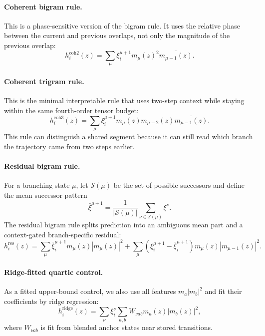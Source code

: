 \documentclass[11pt]{article}
\begin{document}
\paragraph{Coherent bigram rule.}
This is a phase-sensitive version of the bigram rule.  It uses the relative
phase between the current and previous overlaps, not only the magnitude of the
previous overlap:
\begin{equation}
h_i^{\mathrm{coh2}}(z)
=
\sum_\mu
\xi_i^{\mu+1}
m_\mu(z)^2
\overline{m_{\mu-1}(z)} .
\end{equation}

\paragraph{Coherent trigram rule.}
This is the minimal interpretable rule that uses two-step context while staying
within the same fourth-order tensor budget:
\begin{equation}
h_i^{\mathrm{coh3}}(z)
=
\sum_\mu
\xi_i^{\mu+1}
m_\mu(z)
m_{\mu-2}(z)
\overline{m_{\mu-1}(z)} .
\end{equation}
This rule can distinguish a shared segment because it can still read which
branch the trajectory came from two steps earlier.

\paragraph{Residual bigram rule.}
For a branching state $\mu$, let $\mathcal{S}(\mu)$ be the set of possible
successors and define the mean successor pattern
\begin{equation}
\bar{\xi}^{\mu+1}
=
\frac{1}{|\mathcal{S}(\mu)|}
\sum_{\nu\in\mathcal{S}(\mu)}
\xi^\nu .
\end{equation}
The residual bigram rule splits prediction into an ambiguous mean part and a
context-gated branch-specific residual:
\begin{equation}
h_i^{\mathrm{res}}(z)
=
\sum_\mu
\bar{\xi}_i^{\mu+1}
m_\mu(z)|m_\mu(z)|^2
+
\sum_\mu
\left(
\xi_i^{\mu+1}
-
\bar{\xi}_i^{\mu+1}
\right)
m_\mu(z)|m_{\mu-1}(z)|^2 .
\end{equation}

\paragraph{Ridge-fitted quartic control.}
As a fitted upper-bound control, we also use all features
$m_a|m_b|^2$ and fit their coefficients by ridge regression:
\begin{equation}
h_i^{\mathrm{ridge}}(z)
=
\sum_\nu
\xi_i^\nu
\sum_{a,b}
W_{\nu ab}
m_a(z)
|m_b(z)|^2 ,
\end{equation}
where $W_{\nu ab}$ is fit from blended anchor states near stored transitions.
\end{document}
